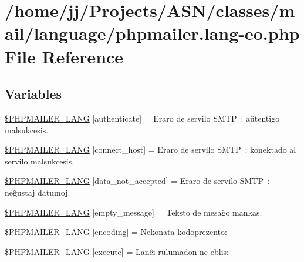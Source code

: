 \hypertarget{phpmailer_8lang-eo_8php}{}\section{/home/jj/\+Projects/\+A\+S\+N/classes/mail/language/phpmailer.lang-\/eo.php File Reference}
\label{phpmailer_8lang-eo_8php}
\subsection*{Variables}
\begin{DoxyCompactItemize}
\item 
\hyperlink{phpmailer_8lang-eo_8php_a2cb33073c989b85580748e331ed8b4aa}{\$\+P\+H\+P\+M\+A\+I\+L\+E\+R\+\_\+\+L\+A\+NG} \mbox{[}\textquotesingle{}authenticate\textquotesingle{}\mbox{]} = \textquotesingle{}Eraro de servilo S\+M\+T\+P \+: aŭtentigo malsukcesis.\textquotesingle{}
\item 
\hyperlink{phpmailer_8lang-eo_8php_a2ee0cc637a06b96e45600db31c6799ee}{\$\+P\+H\+P\+M\+A\+I\+L\+E\+R\+\_\+\+L\+A\+NG} \mbox{[}\textquotesingle{}connect\+\_\+host\textquotesingle{}\mbox{]} = \textquotesingle{}Eraro de servilo S\+M\+T\+P \+: konektado al servilo malsukcesis.\textquotesingle{}
\item 
\hyperlink{phpmailer_8lang-eo_8php_a814c6b191205d2361b3233e9c9d6fda5}{\$\+P\+H\+P\+M\+A\+I\+L\+E\+R\+\_\+\+L\+A\+NG} \mbox{[}\textquotesingle{}data\+\_\+not\+\_\+accepted\textquotesingle{}\mbox{]} = \textquotesingle{}Eraro de servilo S\+M\+T\+P \+: neĝustaj datumoj.\textquotesingle{}
\item 
\hyperlink{phpmailer_8lang-eo_8php_a33772099f637c9d6c2cd7425e0e37fed}{\$\+P\+H\+P\+M\+A\+I\+L\+E\+R\+\_\+\+L\+A\+NG} \mbox{[}\textquotesingle{}empty\+\_\+message\textquotesingle{}\mbox{]} = \textquotesingle{}Teksto de mesaĝo mankas.\textquotesingle{}
\item 
\hyperlink{phpmailer_8lang-eo_8php_a817f7283f3d54c970a0c10305cc668cc}{\$\+P\+H\+P\+M\+A\+I\+L\+E\+R\+\_\+\+L\+A\+NG} \mbox{[}\textquotesingle{}encoding\textquotesingle{}\mbox{]} = \textquotesingle{}Nekonata kodoprezento\+: \textquotesingle{}
\item 
\hyperlink{phpmailer_8lang-eo_8php_a668217a9563a168f30f2a8548b6ed5a9}{\$\+P\+H\+P\+M\+A\+I\+L\+E\+R\+\_\+\+L\+A\+NG} \mbox{[}\textquotesingle{}execute\textquotesingle{}\mbox{]} = \textquotesingle{}Lanĉi rulumadon ne eblis\+: \textquotesingle{}

\end{DoxyCompactItemize}

